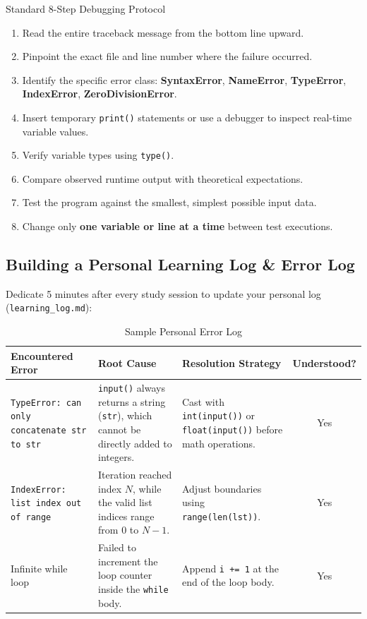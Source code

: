 \documentclass[11pt,a4paper]{article}
\begin{document}
\begin{infobox}{Standard 8-Step Debugging Protocol}
\begin{enumerate}[leftmargin=1.5em, itemsep=2pt]
    \item Read the entire traceback message from the bottom line upward.
    \item Pinpoint the exact file and line number where the failure occurred.
    \item Identify the specific error class: \textbf{SyntaxError}, \textbf{NameError}, \textbf{TypeError}, \textbf{IndexError}, \textbf{ZeroDivisionError}.
    \item Insert temporary \texttt{print()} statements or use a debugger to inspect real-time variable values.
    \item Verify variable types using \texttt{type()}.
    \item Compare observed runtime output with theoretical expectations.
    \item Test the program against the smallest, simplest possible input data.
    \item Change only \textbf{one variable or line at a time} between test executions.
\end{enumerate}
\end{infobox}

\subsection{Building a Personal Learning Log \& Error Log}
Dedicate 5 minutes after every study session to update your personal log (\texttt{learning\_log.md}):

\begin{table}[htbp]
\centering
\small
\begin{tabularx}{\textwidth}{@{}p{4.2cm} X p{3.6cm} c@{}}
\toprule
\textbf{Encountered Error} & \textbf{Root Cause} & \textbf{Resolution Strategy} & \textbf{Understood?} \\
\midrule
\texttt{TypeError: can only concatenate str to str} & \texttt{input()} always returns a string (\texttt{str}), which cannot be directly added to integers. & Cast with \texttt{int(input())} or \texttt{float(input())} before math operations. & Yes \\
\midrule
\texttt{IndexError: list index out of range} & Iteration reached index $N$, while the valid list indices range from $0$ to $N-1$. & Adjust boundaries using \texttt{range(len(lst))}. & Yes \\
\midrule
Infinite while loop & Failed to increment the loop counter inside the \texttt{while} body. & Append \texttt{i += 1} at the end of the loop body. & Yes \\
\bottomrule
\end{tabularx}
\caption{Sample Personal Error Log}
\end{table}
\end{document}
